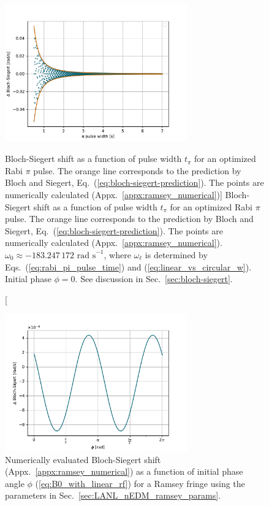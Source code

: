\begin{figure}
    \centering
    \includegraphics[width=0.7\textwidth]{figures/bloch-siegert-rabi.pdf}
    \caption
    [Bloch-Siegert shift as a function of pulse width $t_\pi$ for an optimized Rabi $\pi$ pulse. The  orange line corresponds to the prediction by Bloch and Siegert, Eq.~(\ref{eq:bloch-siegert-prediction}). The  points are numerically calculated (Appx.~\ref{appx:ramsey_numerical})]
    {Bloch-Siegert shift as a function of pulse width $t_\pi$ for an optimized Rabi $\pi$ pulse. The  orange line corresponds to the prediction by Bloch and Siegert, Eq.~(\ref{eq:bloch-siegert-prediction}).  The  points are numerically calculated (Appx.~\ref{appx:ramsey_numerical}). $\omega_0 \approx -183.247\,172 \text{ rad s}^{-1}$, where $\omega_\ell$ is determined by Eqs.~(\ref{eq:rabi_pi_pulse_time}) and (\ref{eq:linear_vs_circular_w}). Initial phase $\phi=0$. See discussion in Sec.~\ref{sec:bloch-siegert}.}
    \label{fig:bloch-siegert-t}
\end{figure}

\begin{figure}
    \centering
    \includegraphics[width=0.7\textwidth]{figures/bloch-siegert-lanl-params.pdf}
    \caption
    {Numerically evaluated Bloch-Siegert shift (Appx.~\ref{appx:ramsey_numerical}) as a function of initial phase angle $\phi$ (\ref{eq:B0_with_linear_rf}) for a Ramsey fringe using the parameters in Sec.~\ref{sec:LANL_nEDM_ramsey_params}.}
    \label{fig:bloch-siegert-phase}
\end{figure}


